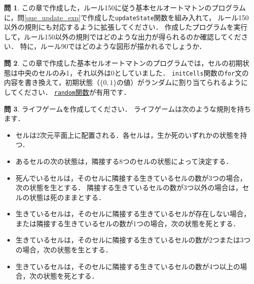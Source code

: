 \documentclass[dvipdfmx]{jsarticle}
\theoremstyle{definition}
\newtheorem{question}{問}[section]
\begin{document}
\begin{question}
    \label{que_cmpECA}
    この章で作成した，ルール150に従う基本セルオートマトンのプログラムに，問\ref{que_update_exp}で作成した\verb|updateState|関数を組み入れて，
    ルール150以外の規則にも対応するように拡張してください．
    作成したプログラムを実行して，ルール150以外の規則ではどのような出力が得られるのか確認してください．
    特に，ルール90ではどのような図形が描かれるでしょうか．
\end{question}

\begin{question}
    この章で作成した基本セルオートマトンのプログラムでは，セルの初期状態は中央のセルのみ1，それ以外は0としていました．
    \verb|initCells|関数の\verb|for|文の内容を書き換えて，初期状態（$\{0,1\}$の値）がランダムに割り当てられるようにしてください．
    \href{https://p5js.org/reference/#/p5/random}{\texttt{random}関数}が有用です．
\end{question}

\begin{question}
    ライフゲームを作成してください．
    ライフゲームは次のような規則を持ちます．
    \begin{itemize}
        \item セルは2次元平面上に配置される．各セルは，生か死のいずれかの状態を持つ．
        \item あるセルの次の状態は，隣接する8つのセルの状態によって決定する．
        \item 死んでいるセルは，そのセルに隣接する生きているセルの数が3つの場合，次の状態を生とする．
            隣接する生きているセルの数が3つ以外の場合は，セルの状態は死のままとする．
        \item 生きているセルは，そのセルに隣接する生きているセルが存在しない場合，
            または隣接する生きているセルの数が1つの場合，次の状態を死とする．
        \item 生きているセルは，そのセルに隣接する生きているセルの数が2つまたは3つの場合，次の状態を生とする．
        \item 生きているセルは，そのセルに隣接する生きているセルの数が4つ以上の場合，次の状態を死とする．
    \end{itemize}
\end{question}
\end{document}
